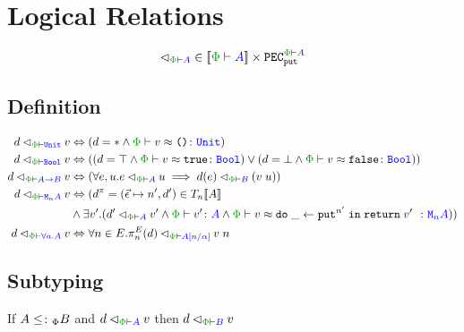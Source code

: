 \documentclass{Report}
\newcommand{\pecputA}[0]{\texttt{PEC}_\put^{\wellformed{\P}{A}}}
\newcommand\eLogRel[4]{\logRel{#2}{\wellformed{#1}{#3}}{#4}}
\newcommand\peLogRel[3]{\eLogRel{\P}{#1}{#2}{#3}}
\newcommand{\zptyperelation}[2]{\typerelation{\P}{#1}{#2}}
\newcommand{\zpberelation}[2]{\berelation{\P}{#1}{#2}}
\newcommand{\fapply}[0]{^E}
\newcommand\liftp[0]{^\pi}
\begin{document}
\section{Logical Relations}

\begin{equation}
    \label{LogicalRelationType}
    \relates_{\wellformed{\P}{A}} \in \deno{\wellformed{\P}{A}} \times \pecputA    
\end{equation}

\subsection{Definition}
\begin{definition}

    \begin{align*}
        \label{LogicalRelationDefinition}
        \peLogRel{d}{\U}{v} & \Leftrightarrow (d=\singleton \wedge \zpberelation{v}{\u}{\U})\\
        \peLogRel{d}{\B}{v} & \Leftrightarrow ((d=\top \wedge \zpberelation{v}{\t}{\B}) \vee (d=\bot \wedge \zpberelation{v}{\f}{\B}))\\
        \peLogRel{d}{\ab}{v} & \Leftrightarrow (\forall e, u. \peLogRel{e}{A}{u}\implies \peLogRel{d(e)}{B}{(\apply{v}{u})})\\
        \peLogRel{d}{\mna}{v}&\Leftrightarrow  (d\liftp = (\ev\mapsto n', d')\in \T{n}{\deno{A}}
        \\ & \wedge \exists v'. (\peLogRel{d'}{A}{v'} \wedge \zptyperelation{v'}{A}\wedge \zpberelation{v}{\doin{\_}{\put^{n'}}{\return{v'}}}{\mna}))
        \\
        \peLogRel{d}{\all{a}{A}}{v} & \Leftrightarrow \forall{n}\in E. \peLogRel{\pi_n\fapply(d)}{A\ssub{\a}{n}}{\eapp{v}{n}}
    \end{align*}
\end{definition}
\subsection{Subtyping}

\begin{theorem}
    If $A\leq\colon_\Phi B$ and $\peLogRel{d}{A}{v}$ then $\peLogRel{d}{B}{v}$
\end{theorem}
\end{document}
